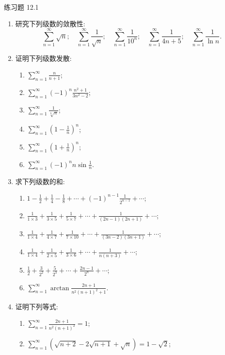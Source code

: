 \begin{exblock}{练习题 12.1}
\begin{enumerate}
  \item 研究下列级数的敛散性:
  \[
    \sum_{n=1}^{\infty}\sqrt{n};\quad\sum_{n=1}^{\infty}\frac{1}{\sqrt{n}};\quad\sum_{n=1}^{\infty}\frac{1}{10^{n}};\quad\sum_{n=1}^{\infty}\frac{1}{4n+5};\quad\sum_{n=1}^{\infty}\frac{1}{\ln n}.
\]
  \item 证明下列级数发散:
  \begin{enumerate}
    \item $\displaystyle\sum_{n=1}^{\infty}\frac{n}{n+1}$;
    \item $\displaystyle\sum_{n=1}^{\infty}(-1)^{n}\frac{n^{2}+1}{3n^{2}-2}$;
    \item $\displaystyle\sum_{n=1}^{\infty}\frac{1}{\sqrt[n]{n}}$;
    \item $\displaystyle\sum_{n=1}^{\infty}\left(1-\frac{1}{n}\right)^{n}$;
    \item $\displaystyle\sum_{n=1}^{\infty}\left(1+\frac{1}{n}\right)^{n}$;
    \item $\displaystyle\sum_{n=1}^{\infty}(-1)^{n}n\sin\frac{1}{n}$.
  \end{enumerate}
  \item 求下列级数的和:
  \begin{enumerate}
    \item $1-\frac{1}{2}+\frac{1}{4}-\frac{1}{8}+\cdots+(-1)^{n-1}\frac{1}{2^{n-1}}+\cdots$;
    \item $\frac{1}{1\times3}+\frac{1}{3\times5}+\frac{1}{5\times7}+\cdots+\frac{1}{(2n-1)(2n+1)}+\cdots$;
    \item $\frac{1}{1\times4}+\frac{1}{4\times7}+\frac{1}{7\times10}+\cdots+\frac{1}{(3n-2)(3n+1)}+\cdots$;
    \item $\frac{1}{1\times4}+\frac{1}{2\times5}+\frac{1}{3\times6}+\cdots+\frac{1}{n(n+3)}+\cdots$;
    \item $\frac{1}{2}+\frac{3}{2^{2}}+\frac{5}{2^{3}}+\cdots+\frac{2n-1}{2^{n}}+\cdots$;
    \item $\displaystyle\sum_{n=1}^{\infty}\arctan\frac{2n+1}{n^{2}(n+1)^{2}+1}$.
  \end{enumerate}
  \item 证明下列等式:
  \begin{enumerate}
    \item $\displaystyle\sum_{n=1}^{\infty}\frac{2n+1}{n^{2}(n+1)^{2}}=1$;
    \item $\displaystyle\sum_{n=1}^{\infty}\left(\sqrt{n+2}-2\sqrt{n+1}+\sqrt{n}\right)=1-\sqrt{2}$;

\end{enumerate}
\end{enumerate}
\end{exblock}
